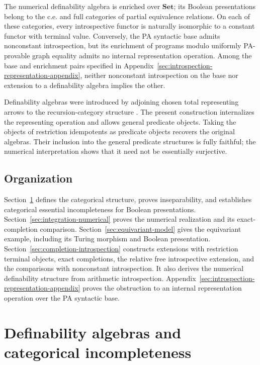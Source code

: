 \documentclass[11pt]{article}
\theoremstyle{definition}
\theoremstyle{remark}
\begin{document}
The numerical definability algebra is enriched over $\mathbf{Set}$;
its Boolean presentations belong to the c.e. and full categories
of partial equivalence relations. On each of these categories,
every introspective functor is naturally isomorphic to a constant
functor with terminal value. Conversely, the PA syntactic base
admits nonconstant introspection, but its enrichment of programs
modulo uniformly PA-provable graph equality admits no internal
representation operation. Among the base and enrichment pairs
specified in Appendix~\ref{sec:introspection-representation-appendix},
neither nonconstant introspection
on the base nor extension to a definability algebra implies the other.

Definability algebras were introduced by adjoining chosen total
representing arrows to the recursion-category structure
\cite[Sections~3--4]{DefinabilityAlgebras}.
The present construction internalizes the representing operation
and allows general predicate objects. Taking the objects of
restriction idempotents as predicate objects recovers the original
algebras. Their inclusion into the general predicate structures
is fully faithful; the numerical interpretation shows that it
need not be essentially surjective.

\subsection{Organization}

Section~\ref{sec:integration} defines the categorical structure,
proves inseparability, and establishes categorical essential
incompleteness for Boolean presentations.
Section~\ref{sec:integration-numerical} proves the numerical
realization and its exact-completion comparison.
Section~\ref{sec:equivariant-model} gives the equivariant example,
including its Turing morphism and Boolean presentation.
Section~\ref{sec:completion-introspection} constructs extensions
with restriction terminal objects, exact completions, the relative
free introspective extension,
and the comparisons with nonconstant introspection. It also
derives the numerical definability structure from arithmetic
introspection.
Appendix~\ref{sec:introspection-representation-appendix} proves
the obstruction to an internal representation operation over
the PA syntactic base.

\section{Definability algebras and categorical incompleteness}
\label{sec:integration}
\end{document}
